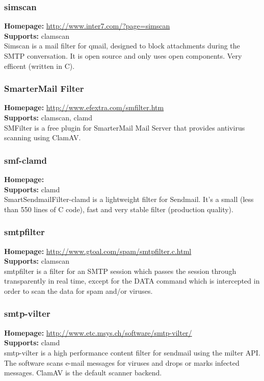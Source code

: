 \documentclass[a4paper,titlepage,12pt]{article}
\begin{document}
    \subsubsection{simscan}
    \textbf{Homepage:} \url{http://www.inter7.com/?page=simscan}\\
    \textbf{Supports:} clamscan\\[4pt]
    Simscan is a mail filter for qmail, designed to block attachments during
    the SMTP conversation. It is open source and only uses open components.
    Very efficent (written in C).

    \subsubsection{SmarterMail Filter}
    \textbf{Homepage:} \url{http://www.efextra.com/smfilter.htm}\\
    \textbf{Supports:} clamscan, clamd\\[4pt]
    SMFilter is a free plugin for SmarterMail Mail Server that provides
    antivirus scanning using ClamAV.

    \subsubsection{smf-clamd}
    \textbf{Homepage:} \url{}\\
    \textbf{Supports:} clamd\\[4pt]
    SmartSendmailFilter-clamd is a lightweight filter for Sendmail. It's
    a small (less than 550 lines of C code), fast and very stable filter
    (production quality).

    \subsubsection{smtpfilter}
    \textbf{Homepage:} \url{http://www.gtoal.com/spam/smtpfilter.c.html}\\
    \textbf{Supports:} clamscan\\[4pt]
    smtpfilter is a filter for an SMTP session which passes the session through
    transparently in real time, except for the DATA command which is
    intercepted in order to scan the data for spam and/or viruses.

    \subsubsection{smtp-vilter}
    \textbf{Homepage:} \url{http://www.etc.msys.ch/software/smtp-vilter/}\\
    \textbf{Supports:} clamd\\[4pt]
    smtp-vilter is a high performance content filter for sendmail
    using the milter API.  The software scans e-mail messages for
    viruses and drops or marks infected messages. ClamAV is the default
    scanner backend.
\end{document}
